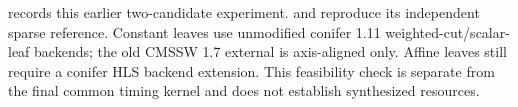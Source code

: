 \begin{implementation}
 records this earlier two-candidate
experiment.  and
 reproduce its independent sparse
reference. Constant leaves use unmodified conifer 1.11 weighted-cut/scalar-leaf
backends; the old CMSSW 1.7 external is axis-aligned only. Affine leaves still
require a conifer HLS backend extension. This feasibility check is separate
from the final common timing kernel and does not establish synthesized resources.
\end{implementation}
